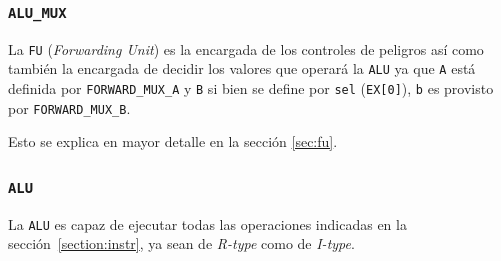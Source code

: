 \documentclass[a4paper]{article}
\begin{document}

\subsubsection{\texttt{ALU\_MUX}}
La \texttt{FU} (\textit{Forwarding Unit}) es la encargada de los controles de peligros así como también la encargada de decidir los valores que operará la \texttt{ALU} ya que \texttt{A} está definida por \texttt{FORWARD\_MUX\_A} y \texttt{B} si bien se define por \texttt{sel} (\texttt{EX[0]}), \texttt{b} es provisto por \texttt{FORWARD\_MUX\_B}.

Esto se explica en mayor detalle en la sección \ref{sec:fu}.

\subsubsection{\texttt{ALU}}
La \texttt{ALU} es capaz de ejecutar todas las operaciones indicadas en la sección~\ref{section:instr}, ya sean de \textit{R-type} como de \textit{I-type}.
\end{document}
